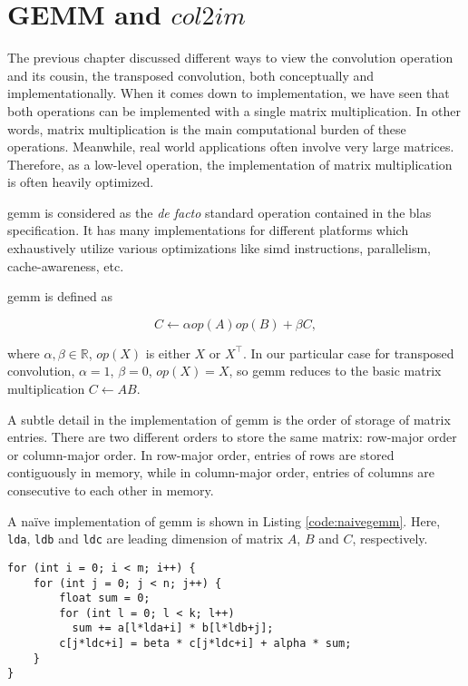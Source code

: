 
\chapter{GEMM and $col2im$}

The previous chapter discussed different ways to view the convolution operation and its cousin,
the transposed convolution, both conceptually and implementationally. When it comes down to implementation,
we have seen that both operations can be implemented with a single matrix multiplication. In other words,
matrix multiplication is the main computational burden of these operations. Meanwhile, real world applications
often involve very large matrices. Therefore, as a low-level operation, the implementation of matrix
multiplication is often heavily optimized.

\gls{gemm} is considered as the \textit{de facto} standard operation
contained in the \gls{blas} specification. It has many implementations for
different platforms which exhaustively utilize various optimizations like \gls{simd} instructions,
parallelism, cache-awareness, etc.

\gls{gemm} is defined as

$$C \leftarrow \alpha op(A) op(B) + \beta C,$$

where $\alpha, \beta \in \mathbb{R}$, $op(X)$ is either $X$ or $X^\intercal$. In our particular case for
transposed convolution, $\alpha = 1$, $\beta = 0$, $op(X) = X$, so \gls{gemm} reduces to the basic
matrix multiplication $C \leftarrow A B$.

A subtle detail in the implementation of \gls{gemm} is the order of storage of matrix entries. There are two
different orders to store the same matrix: row-major order or column-major order. In row-major order,
entries of rows are stored contiguously in memory, while in column-major order, entries of columns are
consecutive to each other in memory.

A naïve implementation of \gls{gemm} is shown in Listing \ref{code:naivegemm}. Here,
\texttt{lda}, \texttt{ldb} and \texttt{ldc} are
leading dimension of matrix $A$, $B$ and $C$, respectively.

\begin{code}
\begin{verbatim}
for (int i = 0; i < m; i++) {
    for (int j = 0; j < n; j++) {
        float sum = 0;
        for (int l = 0; l < k; l++)
          sum += a[l*lda+i] * b[l*ldb+j];
        c[j*ldc+i] = beta * c[j*ldc+i] + alpha * sum;
    }
}
\end{verbatim}
\label{code:naivegemm}
\end{code}

